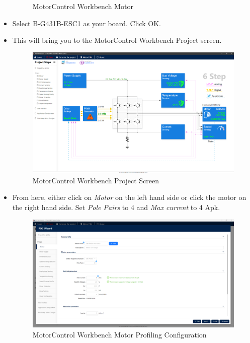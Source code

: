 \documentclass[10pt]{article}
\begin{document}
\begin{itemize}
\begin{figure}[H]
                        \caption{MotorControl Workbench Motor}
                    \end{figure}
                \item Select B-G431B-ESC1 as your board. Click OK.
                \item This will bring you to the MotorControl Workbench Project screen.
                    \begin{figure}[H]
                        \centerline{\includegraphics[width=\textwidth]{References/MCW Project Screen.png}}
                        \caption{MotorControl Workbench Project Screen}
                    \end{figure}
                \item From here, either click on \emph{Motor} on the left hand side or click the motor on the right hand side. Set \emph{Pole Pairs} to 4 and \emph{Max current} to 4 Apk.
                    \begin{figure}[H]
                        \centerline{\includegraphics[width=\textwidth]{References/MCW Motor Profiling.png}}
                        \caption{MotorControl Workbench Motor Profiling Configuration}

\end{figure}
\end{itemize}
\end{document}
